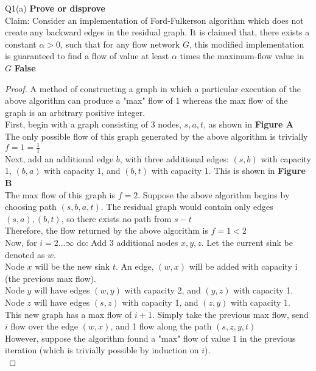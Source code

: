 \begin{problem}
  {Q1(a)}
  \textbf{Prove or disprove} \\
  Claim: Consider an implementation of Ford-Fulkerson algorithm which does not create any backward edges in the residual graph. It is claimed that, there exists a constant $\alpha > 0$, such
  that for any flow network $G$, this modified implementation is guaranteed to find a flow of value at least $\alpha$ times the maximum-flow value in $G$
  \textbf{False} \\
  \begin{proof}
  A method of constructing a graph in which a particular execution of the above algorithm can produce a "max" flow of $1$ whereas the max flow of the graph is an arbitrary positive integer. \\
  First, begin with a graph consisting of 3 nodes, $s,a,t$, as shown in \textbf{Figure A} \\
  The only possible flow of this graph generated by the above algorithm is trivially $f = 1 = \frac{1}{1}$ \\
  Next, add an additional edge $b$, with three additional edges: $(s, b)$ with capacity 1, $(b, a)$ with capacity $1$, and $(b, t)$ with capacity $1$. This is shown in \textbf{Figure B} \\
  The max flow of this graph is $f = 2$. Suppose the above algorithm begins by choosing path $(s, b, a, t)$. The residual graph would contain only edges $(s, a), (b, t)$, so there exists no path from $s-t$ \\
  Therefore, the flow returned by the above algorithm is $f = 1 < 2$ \\
  Now, for $i = 2...\infty$ do:
  Add 3 additional nodes $x, y, z$. Let the current sink be denoted as $w$. \\
  Node $x$ will be the new sink $t$. An edge, $(w, x)$ will be added with capacity i (the previous max flow). \\
  Node $y$ will have edges $(w, y)$ with capacity 2, and $(y, z)$ with capacity 1. \\
  Node $z$ will have edges $(s, z)$ with capacity 1, and $(z, y)$ with capacity 1. \\
  This new graph has a max flow of $i+1$. Simply take the previous max flow, send $i$ flow over the edge $(w, x)$, and 1 flow along the path $(s, z, y, t)$ \\
  However, suppose the algorithm found a "max" flow of value $1$ in the previous iteration (which is trivially possible by induction on $i$). \\

\end{proof}
\end{problem}
